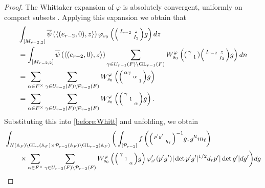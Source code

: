 \documentclass[12pt]{amsart}
\theoremstyle{remark}
\numberwithin{equation}{section}
\newcommand{\A}{\mathbb{A}}
\newcommand{\GL}{\mathrm{GL}}
\theoremstyle{definition}
\newenvironment{psmatrix}
  {\left(\begin{smallmatrix}}
  {\end{smallmatrix}\right)}
\numberwithin{equation}{subsection}
\begin{document}
\begin{proof}
The Whittaker expansion of $\varphi$ is absolutely convergent, uniformly on compact subsets \cite[Theorem 1.1]{CogdellPCMI}.  Applying this expansion we obtain that
\begin{align*}
&\int_{[M_{r-2,2}]}\overline{\psi}\left(\langle (e_{r-2},0),z \rangle \right)\varphi_{s_0}\left(\begin{psmatrix} I_{r-2} & z\\ & I_2 \end{psmatrix}g\right)dz\\
   &= \int_{[M_{r-2,2}]} \overline{\psi}\left(\langle (e_{r-2},0),z \rangle \right)\sum_{\gamma \in U_{r-1}(F) \backslash \GL_{r-1}(F)}W^{\varphi}_{s_0}\left(\begin{psmatrix} \gamma & \\ & 1 \end{psmatrix}\begin{psmatrix} I_{r-2} & z\\ & I_2 \end{psmatrix}g\right)dn\\
   &= \sum_{\alpha \in F^\times}\sum_{\gamma \in U_{r-2}(F) \backslash \mathcal{P}_{r-2}(F)}W^\varphi_{s_0}\left(\begin{psmatrix} \alpha \gamma & & \\ & \alpha & \\ && 1 \end{psmatrix}g \right)\\
   &= \sum_{\alpha \in F^\times}\sum_{\gamma \in U_{r-2}(F) \backslash \mathcal{P}_{r-2}(F)}W^\varphi_{s_0}\left(\begin{psmatrix} \gamma & & \\ & 1 & \\ && \alpha \end{psmatrix}g \right).
\end{align*}
Substituting this into \eqref{before:Whitt} and unfolding, we obtain
\begin{align*}
    & \int_{N(\A_F) \backslash \GL_r(\A_F)\times \mathcal{P}_{r-2}(\A_F) \backslash \GL_{r-2}(\A_F)} \bigg( \int_{[\mathcal{P}_{r-2}]} 
 f\left(\begin{psmatrix} p'g' & \\ & h_{\ell} \end{psmatrix}^{-1}g,g'^{t}m_\ell\right) \\&\hspace{0.3in} \times  \sum_{\alpha \in F^\times}\sum_{\gamma \in U_{r-2}(F) \backslash \mathcal{P}_{r-2}(F)} W^\varphi_{s_0}\left(\begin{psmatrix} \gamma & & \\ & 1 & \\ && \alpha \end{psmatrix}g \right)\varphi'_{s'}(p'g')|\det p'g'|^{1/2}d_rp'|\det g'|dg'\bigg)dg\\

\end{align*}
\end{proof}
\end{document}

